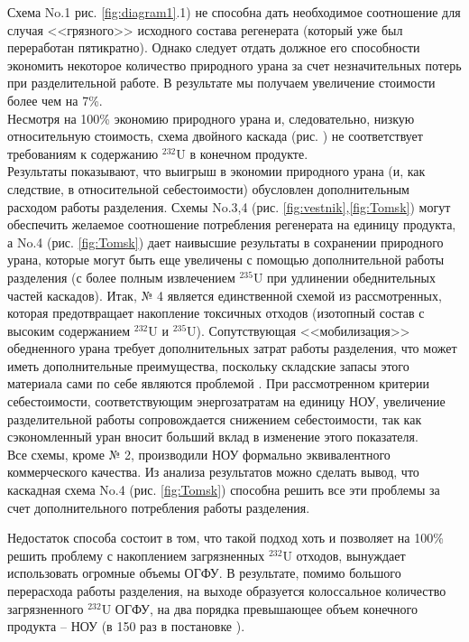Схема No.1 рис. \ref{fig:diagram1}.1)  не способна дать необходимое соотношение для случая <<грязного>> исходного состава регенерата (который уже был переработан пятикратно).
Однако следует отдать должное его способности экономить некоторое количество природного урана за счет незначительных потерь при разделительной работе.
В результате мы получаем увеличение стоимости более чем на 7\%. \\
Несмотря на 100\% экономию природного урана и, следовательно, низкую относительную стоимость, схема двойного каскада (рис. ) не соответствует требованиям к содержанию $^{232}$U в конечном продукте.\\
Результаты показывают, что выигрыш в экономии природного урана (и, как следствие, в относительной себестоимости) обусловлен дополнительным расходом работы разделения.
Схемы No.3,4 (рис. \ref{fig:vestnik},\ref{fig:Tomsk}) могут обеспечить желаемое соотношение потребления регенерата на единицу продукта, а No.4 (рис. \ref{fig:Tomsk}) дает наивысшие результаты в сохранении природного урана, которые могут быть еще увеличены с помощью дополнительной работы разделения (с более полным извлечением $^{235}$U при удлинении обеднительных частей каскадов).
Итак, № 4 является единственной схемой из рассмотренных, которая предотвращает накопление токсичных отходов (изотопный состав с высоким содержанием $^{232}$U и $^{235}$U).
Сопутствующая <<мобилизация>> обедненного урана требует дополнительных затрат работы разделения, что может иметь дополнительные преимущества, поскольку складские запасы этого материала сами по себе являются проблемой \cite{fitchOPTIONSDISPOSALREAPPLICATION2009}.
При рассмотренном критерии себестоимости, соответствующим энергозатратам на единицу НОУ, увеличение разделительной работы сопровождается снижением себестоимости, так как сэкономленный уран вносит больший вклад в изменение этого показателя. \\
Все схемы, кроме № 2, производили НОУ формально эквивалентного коммерческого качества.
Из анализа результатов можно сделать вывод, что каскадная схема No.4 (рис. \ref{fig:Tomsk}) способна решить все эти проблемы за счет дополнительного потребления работы разделения.



Недостаток способа состоит в том, что такой подход хоть и позволяет на 100\% решить проблему с накоплением загрязненных $^{232}$U отходов, вынуждает использовать огромные объемы ОГФУ. В результате, помимо большого перерасхода работы разделения, на выходе образуется колоссальное количество загрязненного $^{232}$U ОГФУ, на два порядка превышающее объем конечного продукта -- НОУ (в 150 раз в постановке \cite{smirnovMethodEnrichReprocessed2019}).

